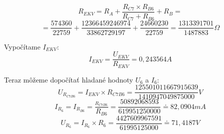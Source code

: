 {\large\[ R_{EKV} = R_A + \frac{R_{C7} \times R_{B6}}{R_{C7} + R_{B6}} + R_B =\]}
{\large\[= \frac{574360}{22759} + \frac{12366459246974}{33862729197}+\frac{24660230}{22759}=\frac{1313391701}{1487883}\Omega\]}
\bigskip

{\Large Vypočítame $I_{EKV}$:}
{\large\[ I_{EKV} = \frac{U_{EKV}}{R_{EKV}} = 0,243564A\]}

{\Large Teraz môžeme dopočítať hladané hodnoty $U_6$ a $I_6$:}
{\large\[ U_{R_{C7B6}} = I_{EKV} \times R_{C7B6} = \frac{125501011667915639}{1410947049875000}V\]}
{\large\[ I_{R_6} = I_{R_{B6}} = \frac{_{R_{C7B6}}}{R_{B6}} = \frac{50892068593}{619951250000} \doteq 82,0904mA\]}
{\large\[ U_{R_6} = I_{R_6} \times R_6 = \frac{4427609967591}{61995125000} \doteq 71,4187V\]}
